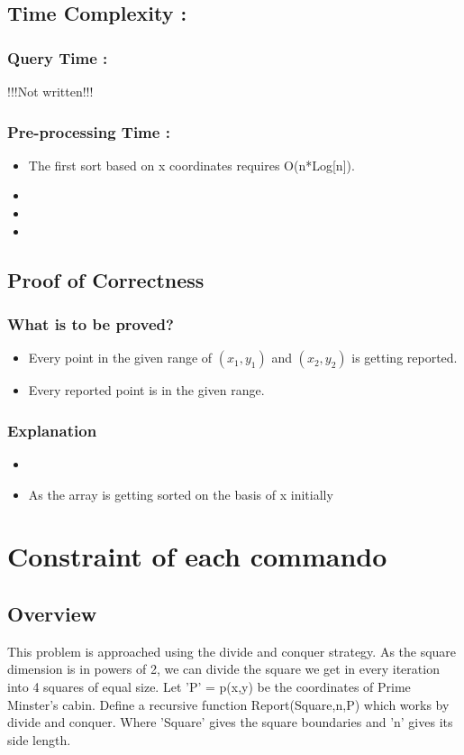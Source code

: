 \documentclass{article}
\begin{document}
\subsection{Time Complexity : }
\subsubsection{Query Time : }
!!!Not written!!!
\subsubsection{Pre-processing Time : }
\begin{itemize}
\item The first sort based on x coordinates requires O(n*Log[n]).
\item 
\item
\item

\end{itemize}
\subsection{Proof of Correctness}
\subsubsection{What is to be proved?}
\begin{itemize}
\item Every point in the given range of $(x_1,y_1)$ and $(x_2,y_2)$ is getting reported.
\item Every reported point is in the given range.
\end{itemize}
\subsubsection{Explanation}
\begin{itemize}
\item 
\item As the array is getting sorted on the basis of x initially
\end{itemize}
\newpage
\section{Constraint of each commando}
\subsection{Overview}
This problem is approached using the divide and conquer strategy. As the square dimension is in powers of 2, we can divide the square we get in every iteration into 4 squares of equal size. Let 'P' = p(x,y) be the coordinates of Prime Minster's cabin. Define a recursive function Report(Square,n,P) which works by divide and conquer. Where 'Square' gives the square boundaries and 'n' gives its side length. 
\end{document}
